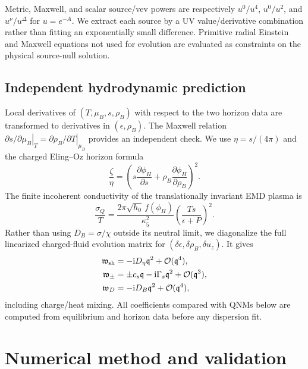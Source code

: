 \documentclass[11pt,a4paper]{article}
\newcommand{\ii}{\mathrm{i}}
\newcommand{\mub}{\mu_B}
\newcommand{\rhob}{\rho_B}
\newcommand{\w}{\mathfrak{w}}
\newcommand{\q}{\mathfrak{q}}
\newcommand{\order}{\mathcal{O}}
\begin{document}
Metric, Maxwell, and scalar source/vev powers are respectively $u^0/u^4$,
$u^0/u^2$, and $u^\nu/u^\Delta$ for $u=e^{-A}$.  We extract each source by a
UV value/derivative combination rather than fitting an exponentially small
difference.  Primitive radial Einstein and Maxwell equations not used for
evolution are evaluated as constraints on the physical source-null solution.

\subsection{Independent hydrodynamic prediction}
\label{sec:hydro-formulas}

Local derivatives of $(T,\mub,s,\rhob)$ with respect to the two horizon data
are transformed to derivatives in $(\epsilon,\rhob)$.  The Maxwell relation
$\left.\partial s/\partial\mub\right|_T=
\left.\partial\rhob/\partial T\right|_{\mub}$ provides an independent check.
We use $\eta=s/(4\pi)$ and the charged Eling--Oz horizon
formula \cite{Eling:2011ct}
\begin{equation}
 \frac{\zeta}{\eta}=\left(s\frac{\partial\phi_H}{\partial s}
 +\rhob\frac{\partial\phi_H}{\partial\rhob}\right)^2.
 \label{eq:eling-oz}
\end{equation}
The finite incoherent conductivity of the translationally invariant EMD
plasma is \cite{Zhou:2015qui}
\begin{equation}
 \frac{\sigma_Q}{T}=\frac{2\pi\sqrt{h_0}\,f(\phi_H)}{\kappa_5^2}
 \left(\frac{Ts}{\epsilon+P}\right)^2.
 \label{eq:sigmaQ}
\end{equation}
Rather than using $D_B=\sigma/\chi$ outside its neutral limit, we diagonalize
the full linearized charged-fluid evolution matrix for
$(\delta\epsilon,\delta\rhob,\delta u_z)$.  It gives
\begin{align}
 \w_{\rm sh}&=-\ii D_\eta\q^2+\order(\q^4),\nonumber\\
 \w_\pm&=\pm c_s\q-\ii\Gamma_s\q^2+\order(\q^3),\nonumber\\
 \w_D&=-\ii D_B\q^2+\order(\q^4),
 \label{eq:hydro-dispersions}
\end{align}
including charge/heat mixing.  All coefficients compared with QNMs below are
computed from equilibrium and horizon data before any dispersion fit.

\section{Numerical method and validation}
\label{sec:numerics}
\end{document}
